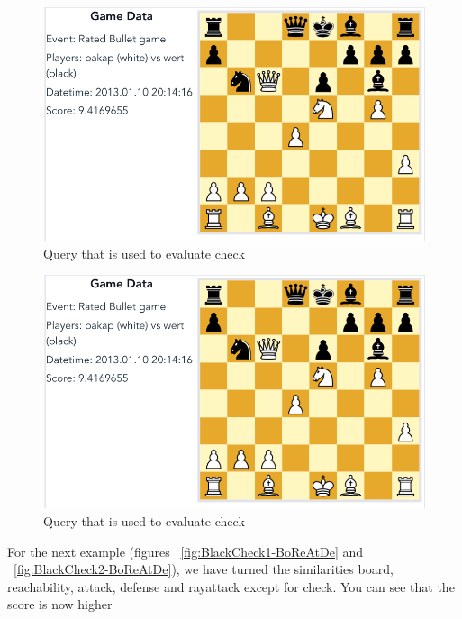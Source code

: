 \documentclass[11pt]{article}
\begin{document}
    \begin{figure}[H]
        \centering
        \includegraphics[width=14cm]{images/BlackCheck1-Bo}
        \caption{Query that is used to evaluate check}
        \label{fig:BlackCheck1-Bo}
    \end{figure}

    \begin{figure}[H]
        \centering
        \includegraphics[width=14cm]{images/BlackCheck1-Bo}
        \caption{Query that is used to evaluate check}
        \label{fig:BlackCheck2-Bo}
    \end{figure}

    For the next example (figures ~\ref{fig:BlackCheck1-BoReAtDe} and ~\ref{fig:BlackCheck2-BoReAtDe}), we have turned the similarities board, reachability, attack, defense and rayattack except for check. You can see that the score is now higher
\end{document}
